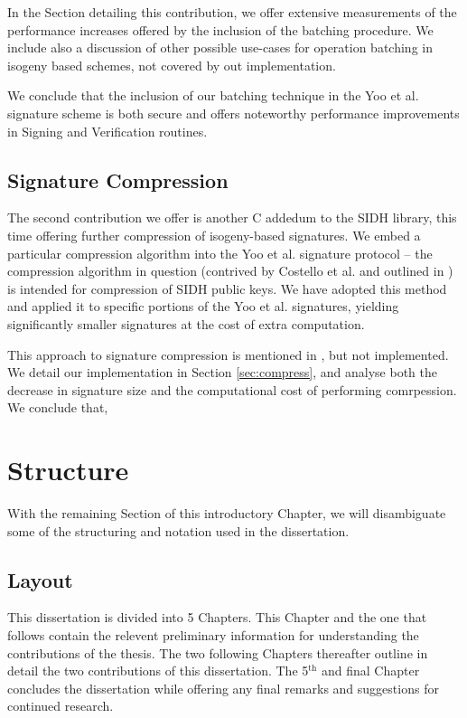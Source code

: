 In the Section detailing this contribution, we offer extensive measurements of the performance increases offered by the inclusion of the batching procedure. We include also a discussion of other possible use-cases for operation batching in isogeny based schemes, not covered by out implementation.

We conclude that the inclusion of our batching technique in the Yoo et al. signature scheme is both secure and offers noteworthy performance improvements in Signing and Verification routines.


\subsection{Signature Compression}

The second contribution we offer is another C addedum to the SIDH library, this time offering further compression of isogeny-based signatures.  We embed a particular compression algorithm into the Yoo et al. signature protocol -- the compression algorithm in question (contrived by Costello et al. and outlined in \cite{pkcomp}) is intended for compression of SIDH public keys. We have adopted this method and applied it to specific portions of the Yoo et al. signatures, yielding significantly smaller signatures at the cost of extra computation.

This approach to signature compression is mentioned in \cite{yoo}, but not implemented. We detail our implementation in Section \ref{sec:compress}, and analyse both the decrease in signature size and the computational cost of performing comrpession. We conclude that, 

\section{Structure}

With the remaining Section of this introductory Chapter, we will disambiguate some of the structuring and notation used in the dissertation.

\subsection{Layout}

This dissertation is divided into 5 Chapters. This Chapter and the one that follows contain the relevent preliminary information for understanding the contributions of the thesis. The two following Chapters thereafter outline in detail the two contributions of this dissertation. The 5$^{\text{th}}$ and final Chapter concludes the dissertation while offering any final remarks and suggestions for continued research.

